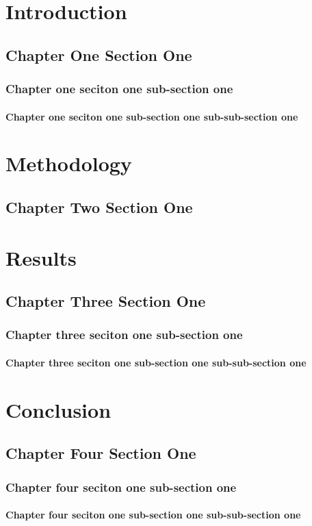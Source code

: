\justifying
\chapter{Introduction}
\section{Chapter One Section One}
\subsection{Chapter one seciton one sub-section one}
\subsubsection{Chapter one seciton one sub-section one sub-sub-section one}

\chapter{Methodology}
\section{Chapter Two Section One}

\chapter{Results}
\section{Chapter Three Section One}
\subsection{Chapter three seciton one sub-section one}
\subsubsection{Chapter three seciton one sub-section one sub-sub-section one}


\chapter{Conclusion}
\section{Chapter Four Section One}
\subsection{Chapter four seciton one sub-section one}
\subsubsection{Chapter four seciton one sub-section one sub-sub-section one}

